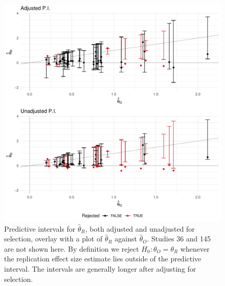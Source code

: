 \documentclass[11pt]{article}
\theoremstyle{definition}
\theoremstyle{custom}
\newcommand{\htheta}{\hat{\theta}}
\begin{document}
  \begin{figure}[htbp]
    \centering
    \includegraphics[width=\hsize]{pi}
    \caption{Predictive intervals for $\htheta_R$, both adjusted and unadjusted for selection, overlay with a plot of $\htheta_R$ against $\htheta_O$. Studies 36 and 145 are not shown here. By definition we reject $H_0: \theta_O = \theta_R$ whenever the replication effect size estimate lies outside of the predictive interval. The intervals are generally longer after adjusting for selection.}
  \label{fig:pi}
  \end{figure}
\end{document}
